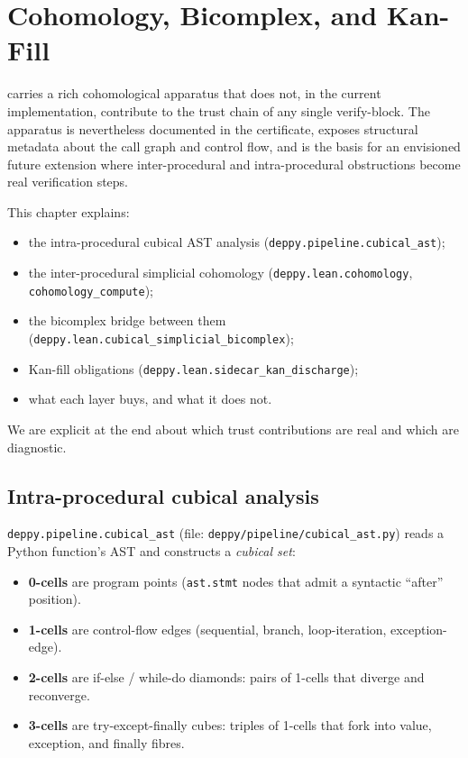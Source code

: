 \chapter{Cohomology, Bicomplex, and Kan-Fill}
\label{ch:cohomology}

\Deppy{} carries a rich cohomological apparatus that does not, in
the current implementation, contribute to the trust chain of any
single verify-block.  The apparatus is nevertheless documented in
the certificate, exposes structural metadata about the call graph
and control flow, and is the basis for an envisioned future
extension where inter-procedural and intra-procedural obstructions
become real verification steps.

This chapter explains:
\begin{itemize}[leftmargin=1.7em]
  \item the intra-procedural cubical AST analysis
    (\texttt{deppy.pipeline.cubical\_ast});
  \item the inter-procedural simplicial cohomology
    (\texttt{deppy.lean.cohomology}, \texttt{cohomology\_compute});
  \item the bicomplex bridge between them
    (\texttt{deppy.lean.cubical\_simplicial\_bicomplex});
  \item Kan-fill obligations
    (\texttt{deppy.lean.sidecar\_kan\_discharge});
  \item what each layer buys, and what it does not.
\end{itemize}

We are explicit at the end about which trust contributions are
real and which are diagnostic.

\section{Intra-procedural cubical analysis}
\label{sec:intra-cubical}

\texttt{deppy.pipeline.cubical\_ast} (file:
\texttt{deppy/pipeline/cubical\_ast.py}) reads a Python function's
AST and constructs a \emph{cubical set}:

\begin{itemize}[leftmargin=1.7em]
  \item \textbf{0-cells} are program points
    (\texttt{ast.stmt} nodes that admit a syntactic ``after'' position).
  \item \textbf{1-cells} are control-flow edges (sequential, branch,
    loop-iteration, exception-edge).
  \item \textbf{2-cells} are if-else / while-do diamonds: pairs of
    1-cells that diverge and reconverge.
  \item \textbf{3-cells} are try-except-finally cubes: triples of
    1-cells that fork into value, exception, and finally fibres.
\end{itemize}

